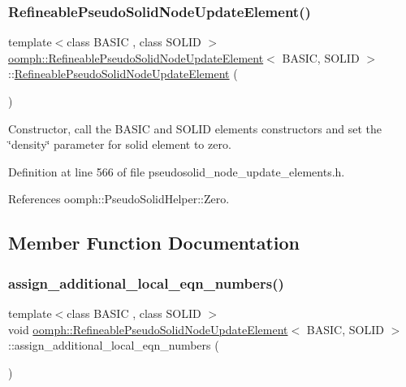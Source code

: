 \subsubsection{\texorpdfstring{Refineable\+Pseudo\+Solid\+Node\+Update\+Element()}{RefineablePseudoSolidNodeUpdateElement()}}
{\footnotesize\ttfamily template$<$class B\+A\+S\+IC , class S\+O\+L\+ID $>$ \\
\hyperlink{classoomph_1_1RefineablePseudoSolidNodeUpdateElement}{oomph\+::\+Refineable\+Pseudo\+Solid\+Node\+Update\+Element}$<$ B\+A\+S\+IC, S\+O\+L\+ID $>$\+::\hyperlink{classoomph_1_1RefineablePseudoSolidNodeUpdateElement}{Refineable\+Pseudo\+Solid\+Node\+Update\+Element} (\begin{DoxyParamCaption}{ }\end{DoxyParamCaption})\hspace{0.3cm}{\ttfamily [inline]}}



Constructor, call the B\+A\+S\+IC and S\+O\+L\+ID elements\textquotesingle{} constructors and set the \char`\"{}density\char`\"{} parameter for solid element to zero. 



Definition at line 566 of file pseudosolid\+\_\+node\+\_\+update\+\_\+elements.\+h.



References oomph\+::\+Pseudo\+Solid\+Helper\+::\+Zero.



\subsection{Member Function Documentation}
\mbox{\label{classoomph_1_1RefineablePseudoSolidNodeUpdateElement_aa6056e3f49ad76050543b1b11475d95f}} 
\subsubsection{\texorpdfstring{assign\+\_\+additional\+\_\+local\+\_\+eqn\+\_\+numbers()}{assign\_additional\_local\_eqn\_numbers()}}
{\footnotesize\ttfamily template$<$class B\+A\+S\+IC , class S\+O\+L\+ID $>$ \\
void \hyperlink{classoomph_1_1RefineablePseudoSolidNodeUpdateElement}{oomph\+::\+Refineable\+Pseudo\+Solid\+Node\+Update\+Element}$<$ B\+A\+S\+IC, S\+O\+L\+ID $>$\+::assign\+\_\+additional\+\_\+local\+\_\+eqn\+\_\+numbers (\begin{DoxyParamCaption}{ }\end{DoxyParamCaption})\hspace{0.3cm}{\ttfamily [inline]}}



